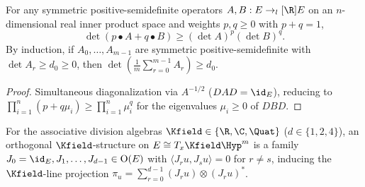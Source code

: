 \begin{theorem}
\label{thm_bcg_lemma_b2}
\leanok
{}
For any symmetric positive-semidefinite operators $A, B : E \to_l[\R] E$ on an $n$-dimensional real inner product space and weights $p, q \ge 0$ with $p + q = 1$,
$$\det(p \bullet A + q \bullet B) \ge (\det A)^p (\det B)^q.$$
By induction, if $A_0, \dots, A_{m-1}$ are symmetric positive-semidefinite with $\det A_r \ge d_0 \ge 0$, then $\det\left(\frac{1}{m}\sum_{r=0}^{m-1} A_r\right) \ge d_0$.
\end{theorem}
\begin{proof}\leanok Simultaneous diagonalization via $A^{-1/2}$ ($D A D = \id_E$), reducing to $\prod_{i=1}^n (p + q \mu_i) \ge \prod_{i=1}^n \mu_i^q$ for the eigenvalues $\mu_i \ge 0$ of $D B D$.\end{proof}

\begin{definition}
\label{def_orthogonal_k_structure}
\leanok
{}
For the associative division algebras $\Kfield \in \{\R, \C, \Quat\}$ ($d \in \{1, 2, 4\}$), an orthogonal $\Kfield$-structure on $E \cong T_x \Kfield\Hyp^m$ is a family $J_0 = \id_E, J_1, \dots, J_{d-1} \in \mathrm{O}(E)$ with $\langle J_r u, J_s u\rangle = 0$ for $r \ne s$, inducing the $\Kfield$-line projection $\pi_u = \sum_{r=0}^{d-1} (J_r u) \otimes (J_r u)^*$.
\end{definition}

